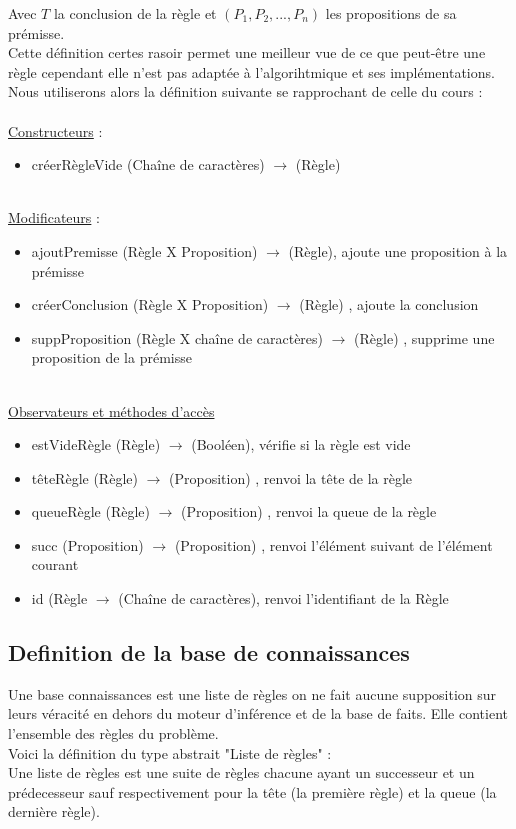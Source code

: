 \documentclass{article}
\begin{document}
Avec $T$ la conclusion de la règle et $(P_1,P_2,...,P_n)$ les propositions de sa prémisse.\\


Cette définition certes rasoir permet une meilleur vue de ce que peut-être une règle cependant elle n'est pas adaptée à l'algorihtmique et ses implémentations.\\
Nous utiliserons alors la définition suivante se rapprochant de celle du cours : \\
\\
\underline{Constructeurs} : 

\begin{itemize}
    \item créerRègleVide (Chaîne de caractères) $\longrightarrow$ (Règle)
\end{itemize}
\\
\underline{Modificateurs} : 
\\  

\begin{itemize}
    \item ajoutPremisse (Règle X Proposition) $\longrightarrow$ (Règle), ajoute une proposition à la prémisse
    \item créerConclusion (Règle X Proposition) $\longrightarrow$ (Règle) , ajoute la conclusion
    \item suppProposition (Règle X chaîne de caractères) $\longrightarrow$ (Règle) , supprime une proposition de la prémisse
\end{itemize}
\\
\underline{Observateurs et méthodes d'accès}
\begin{itemize}
    \item estVideRègle (Règle) $\longrightarrow$ (Booléen), vérifie si la règle est vide
    \item têteRègle (Règle) $\longrightarrow$ (Proposition) , renvoi la tête de la règle
    \item queueRègle (Règle) $\longrightarrow$ (Proposition) , renvoi la queue de la règle
    \item succ (Proposition) $\longrightarrow$ (Proposition) , renvoi l'élément suivant de l'élément courant
    \item id (Règle $\longrightarrow$ (Chaîne de caractères), renvoi l'identifiant de la Règle
\end{itemize}

\subsection{Definition de la base de connaissances}
Une base connaissances est une liste de règles on ne fait aucune supposition sur leurs véracité en dehors du moteur d'inférence et de la base de faits.
Elle contient l'ensemble des règles du problème.
\\Voici la définition du type abstrait "Liste de règles" : \\
Une liste de règles est une suite de règles chacune ayant un successeur et un prédecesseur sauf respectivement pour la tête (la première règle) et la queue (la dernière règle).
\end{document}
